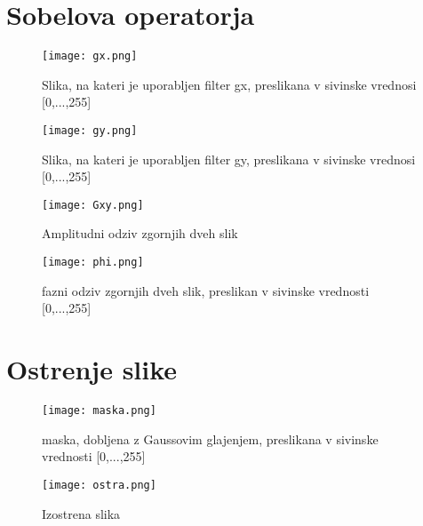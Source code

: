 \documentclass[12pt,a4paper]{article}
\begin{document}
\section{Sobelova operatorja}
\begin{figure}[h!]
  \begin{center}
    \texttt{[image: gx.png]}
    \caption{Slika, na kateri je uporabljen filter gx, preslikana v sivinske vrednosi [0,...,255]}
    \label{fig:}
  \end{center}
\end{figure}
\begin{figure}[h!]
  \begin{center}
    \texttt{[image: gy.png]}
    \caption{Slika, na kateri je uporabljen filter gy, preslikana v sivinske vrednosi [0,...,255]}
    \label{fig:}
  \end{center}
\end{figure}
\pagebreak
\begin{figure}[h!]
  \begin{center}
    \texttt{[image: Gxy.png]}
    \caption{Amplitudni odziv zgornjih dveh slik}
    \label{fig:}
  \end{center}
\end{figure}
\pagebreak
\begin{figure}[h!]
  \begin{center}
    \texttt{[image: phi.png]}
    \caption{fazni odziv zgornjih dveh slik, preslikan v sivinske vrednosti [0,...,255]}
    \label{fig:}
  \end{center}
\end{figure}
\section{Ostrenje slike}
\begin{figure}[h!]
  \begin{center}
    \texttt{[image: maska.png]}
    \caption{maska, dobljena z Gaussovim glajenjem, preslikana v sivinske vrednosti [0,...,255]}
    \label{fig:}
  \end{center}
\end{figure}
\pagebreak
\begin{figure}[h!]
  \begin{center}
    \texttt{[image: ostra.png]}
    \caption{Izostrena slika}
    \label{fig:}
  \end{center}
\end{figure}
\end{document}

